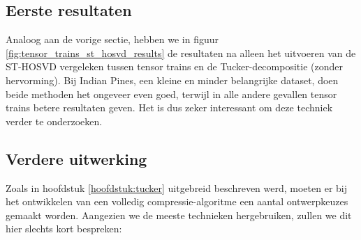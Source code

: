 \subsection{Eerste resultaten}

Analoog aan de vorige sectie, hebben we in figuur \ref{fig:tensor_trains_st_hosvd_results} de resultaten na alleen het uitvoeren van de ST-HOSVD vergeleken tussen tensor trains en de Tucker-decompositie (zonder hervorming). Bij Indian Pines, een kleine en minder belangrijke dataset, doen beide methoden het ongeveer even goed, terwijl in alle andere gevallen tensor trains betere resultaten geven. Het is dus zeker interessant om deze techniek verder te onderzoeken.

\subsection{Verdere uitwerking}

Zoals in hoofdstuk \ref{hoofdstuk:tucker} uitgebreid beschreven werd, moeten er bij het ontwikkelen van een volledig compressie-algoritme een aantal ontwerpkeuzes gemaakt worden. Aangezien we de meeste technieken hergebruiken, zullen we dit hier slechts kort bespreken:

